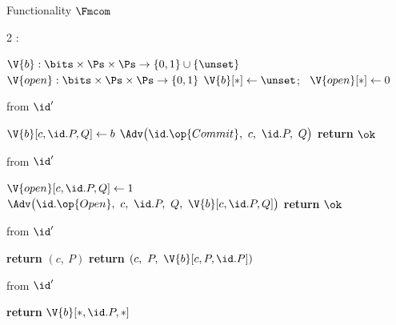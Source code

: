 \begin{interface}[nofloat]{Functionality $\Fmcom$ \\
\params{$\PID$, \quad $\Ps$, \quad $\admits$, \quad
$\uses := \{(\Adv,\serves)\}$, \quad $\pars := \none$}}

{\scriptsize
\setlength{\columnsep}{1.4em}
\begin{multicols}{2}
:
\begin{algorithmic}[1]
\setcounter{contline}{0}\algcont
\State $\V{b} : \bits \times \Ps \times \Ps \to \{0,1\} \cup \{\unset\}$
\State $\V{open} : \bits \times \Ps \times \Ps \to \{0,1\}$
\State $\V{b}[*] \gets \unset$; \ $\V{open}[*] \gets 0$
\algsave
\end{algorithmic}
\vspace{1.4ex}

 \quad from $\id'$
\begin{algorithmic}[1]
\algcont
{} \label{ln:mcomonce}
\State $\V{b}[c, \id.P, Q] \gets b$
\State $\Adv\bigl(\id.\op{Commit},\ c,\ \id.P,\ Q\bigr)$ \label{ln:mcomreceipt}
\State \textbf{return} $\ok$
\algsave
\end{algorithmic}
\vspace{1.4ex}

 \quad from $\id'$
\begin{algorithmic}[1]
\algcont
{} \label{ln:mcomopener}
\State $\V{open}[c, \id.P, Q] \gets 1$ \label{ln:mcomreopen}
\State $\Adv\bigl(\id.\op{Open},\ c,\ \id.P,\ Q,\ \V{b}[c, \id.P, Q]\bigr)$
\State \textbf{return} $\ok$
\algsave
\end{algorithmic}
\vspace{1.4ex}

\columnbreak

 \quad from $\id'$
\begin{algorithmic}[1]
\algcont
{}
  \State \textbf{return} $(c,\ P)$ \label{ln:mcomhide}
\EndIf
\State \textbf{return} $(c,\ P,\ \V{b}[c, P, \id.P])$ \label{ln:mcombind}
\algsave
\end{algorithmic}
\vspace{1.4ex}

 \quad from $\id'$
\begin{algorithmic}[1]
\algcont
\State \textbf{return} $\V{b}[*, \id.P, *]$ \label{ln:mcomleak}
\algsave
\end{algorithmic}
\end{multicols}}
\end{interface}
